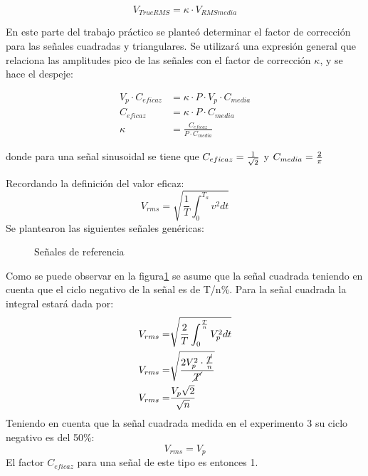 \begin{equation}
    V_{TrueRMS}=\kappa\cdot V_{RMSmedia}
    \label{eq:corrCalcTrueRms}
\end{equation}


 En este parte del trabajo práctico se planteó determinar el factor de corrección para las señales cuadradas y triangulares. Se utilizará una expresión general que relaciona las amplitudes pico de las señales con el factor de corrección $\kappa$, y se hace el despeje:
 
 \begin{equation}
    \begin{aligned}
    V_p \cdot C_{eficaz}&=\kappa \cdot P \cdot V_p\cdot C_{media}\\
     C_{eficaz}&=\kappa \cdot P \cdot C_{media}\\
     \kappa&=\frac{C_{eficaz}}{P \cdot C_{media}}
    \end{aligned}
    \label{eq:factorKappa}
\end{equation}

donde para una señal sinusoidal se tiene que $C_{eficaz} = {1\over\sqrt{2}}$ y $C_{media} = {2\over\pi}$

Recordando la definición del valor eficaz:
\begin{equation}
    V_{rms}=\sqrt{\frac{1}{T}\int_{0}^{T_{a}}v^2dt}
\end{equation}
Se plantearon las siguientes señales genéricas:
\begin{figure}[H]
    \centering
    \begin{minipage}{0.49\textwidth}
        \centering
        
    \end{minipage}
    \begin{minipage}{0.49\textwidth}
        \centering
        
    \end{minipage}
   
    \caption{Señales de referencia}
    \label{fig:Señref}
\end{figure}

Como se puede observar en la figura\ref{fig:Señref} se asume que la señal cuadrada teniendo en cuenta que el ciclo negativo de la señal es de T/n\%.
Para la señal cuadrada la integral estará dada por:
\begin{equation}
    \begin{aligned}
         V_{rms}=&\sqrt{\frac{2}{T}\int_{0}^{\frac{T}{n}}V_{p}^2dt}\\
         V_{rms}=&\sqrt{\frac{2V_{p}^2\cdot\frac{\cancel{T}}{n}}{\cancel{T}}}\\
         V_{rms}=&\frac{V_{p}\sqrt{2}}{\sqrt{n}}
    \end{aligned}
\end{equation}
Teniendo en cuenta que la señal cuadrada medida en el experimento 3 su ciclo negativo es del 50\%:
\begin{equation}
    V_{rms}=V_{p}
\end{equation}
El factor $C_{eficaz}$ para una señal de este tipo es entonces 1.


